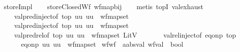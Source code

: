 \begin{isabellebody}
\ \ \ storeImpl\isanewline
%
\isadelimproof
\ \ %
\endisadelimproof
%
\isatagproof
{}\isamarkupfalse%
\ storeClosedWf\ wf{\isacharunderscore}{\kern0pt}map{\isacharunderscore}{\kern0pt}bij\isanewline
\ \ \isamarkupfalse%
\ {\isacharparenleft}{\kern0pt}metis\ top{}I\ val{\isachardot}{\kern0pt}exhaust\isanewline
\ \ \ \ \ \ val{\isachardot}{\kern0pt}pred{\isacharunderscore}{\kern0pt}inject{\isacharparenleft}{\kern0pt}{}{\isacharparenright}{\kern0pt}{\isacharbrackleft}{\kern0pt}of\ top\ {\isachardoublequoteopen}{\isasymlambda}uu{\isachardot}{\kern0pt}\ uu\ {\isasymin}\ wf{\isacharunderscore}{\kern0pt}map{\isacharunderscore}{\kern0pt}set{\isachardoublequoteclose}{\isacharbrackright}{\kern0pt}\isanewline
\ \ \ \ \ \ val{\isachardot}{\kern0pt}pred{\isacharunderscore}{\kern0pt}inject{\isacharparenleft}{\kern0pt}{}{\isacharparenright}{\kern0pt}{\isacharbrackleft}{\kern0pt}of\ top\ {\isachardoublequoteopen}{\isasymlambda}uu{\isachardot}{\kern0pt}\ uu\ {\isasymin}\ wf{\isacharunderscore}{\kern0pt}map{\isacharunderscore}{\kern0pt}set{\isachardoublequoteclose}{\isacharbrackright}{\kern0pt}\isanewline
\ \ \ \ \ \ val{\isachardot}{\kern0pt}pred{\isacharunderscore}{\kern0pt}rel{\isacharbrackleft}{\kern0pt}of\ top\ {\isachardoublequoteopen}{\isasymlambda}uu{\isachardot}{\kern0pt}\ uu\ {\isasymin}\ wf{\isacharunderscore}{\kern0pt}map{\isacharunderscore}{\kern0pt}set{\isachardoublequoteclose}\ {\isachardoublequoteopen}LitV\ {\isacharunderscore}{\kern0pt}{\isachardoublequoteclose}{\isacharbrackright}{\kern0pt}\isanewline
\ \ \ \ \ \ val{\isachardot}{\kern0pt}rel{\isacharunderscore}{\kern0pt}inject{\isacharparenleft}{\kern0pt}{}{\isacharparenright}{\kern0pt}{\isacharbrackleft}{\kern0pt}of\ {\isachardoublequoteopen}eq{\isacharunderscore}{\kern0pt}onp\ top{\isachardoublequoteclose}\isanewline
\ \ \ \ \ \ \ \ {\isachardoublequoteopen}eq{\isacharunderscore}{\kern0pt}onp\ {\isacharparenleft}{\kern0pt}{\isasymlambda}uu{\isachardot}{\kern0pt}\ uu\ {\isasymin}\ wf{\isacharunderscore}{\kern0pt}map{\isacharunderscore}{\kern0pt}set{\isacharparenright}{\kern0pt}{\isachardoublequoteclose}{\isacharbrackright}{\kern0pt}{\isacharparenright}{\kern0pt}%
\endisatagproof
{\isafoldproof}%
%
\isadelimproof
\isanewline
%
\endisadelimproof
\isanewline
{}\isamarkupfalse%
\ wf{\isacharunderscore}{\kern0pt}wf\ {\isacharcolon}{\kern0pt}{\isacharcolon}{\kern0pt}\ {\isachardoublequoteopen}{\isacharprime}{\kern0pt}a{\isacharcolon}{\kern0pt}{\isacharcolon}{\kern0pt}absval\ wf{\isacharunderscore}{\kern0pt}val\ {\isasymRightarrow}\ bool{\isachardoublequoteclose}\isanewline

\end{isabellebody}
